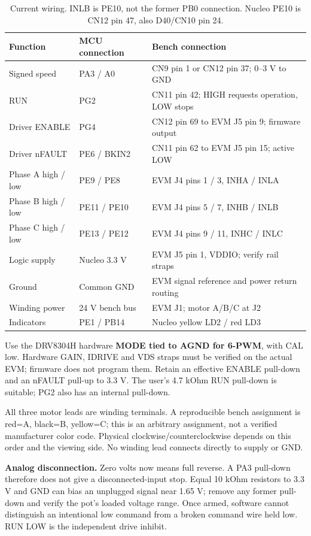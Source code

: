 \documentclass[11pt,letterpaper]{article}
\begin{document}
\begin{table}[H]
\centering\small
\begin{tabularx}{\linewidth}{@{}l l Y@{}}
\toprule
Function & MCU connection & Bench connection \\
\midrule
Signed speed & PA3 / A0 & CN9 pin 1 or CN12 pin 37; 0--3 V to GND \\
RUN & PG2 & CN11 pin 42; HIGH requests operation, LOW stops \\
Driver ENABLE & PG4 & CN12 pin 69 to EVM J5 pin 9; firmware output \\
Driver nFAULT & PE6 / BKIN2 & CN11 pin 62 to EVM J5 pin 15; active LOW \\
Phase A high / low & PE9 / PE8 & EVM J4 pins 1 / 3, INHA / INLA \\
Phase B high / low & PE11 / PE10 & EVM J4 pins 5 / 7, INHB / INLB \\
Phase C high / low & PE13 / PE12 & EVM J4 pins 9 / 11, INHC / INLC \\
Logic supply & Nucleo 3.3 V & EVM J5 pin 1, VDDIO; verify rail straps \\
Ground & Common GND & EVM signal reference and power return routing \\
Winding power & 24 V bench bus & EVM J1; motor A/B/C at J2 \\
Indicators & PE1 / PB14 & Nucleo yellow LD2 / red LD3 \\
\bottomrule
\end{tabularx}
\caption{Current wiring. INLB is PE10, not the former PB0 connection.
Nucleo PE10 is CN12 pin 47, also D40/CN10 pin 24.}
\end{table}

Use the DRV8304H hardware \textbf{MODE tied to AGND for 6-PWM}, with CAL low.
Hardware GAIN, IDRIVE and VDS straps must be verified on the actual EVM;
firmware does not program them. Retain an effective ENABLE pull-down and an
nFAULT pull-up to 3.3 V. The user's 4.7 kOhm RUN pull-down is suitable;
PG2 also has an internal pull-down.\cite{drv,evm,nucleo}

All three motor leads are winding terminals. A reproducible bench assignment
is red=A, black=B, yellow=C; this is an arbitrary assignment, not a verified
manufacturer color code. Physical clockwise/counterclockwise depends on this
order and the viewing side. No winding lead connects directly to supply or GND.

\textbf{Analog disconnection.} Zero volts now means full reverse.
A PA3 pull-down therefore does not give a disconnected-input stop. Equal
10 kOhm resistors to 3.3 V and GND can bias an unplugged signal near 1.65 V;
remove any former pull-down and verify the pot's loaded voltage range.
Once armed, software cannot distinguish an intentional low command from a
broken command wire held low. RUN LOW is the independent drive inhibit.
\end{document}
